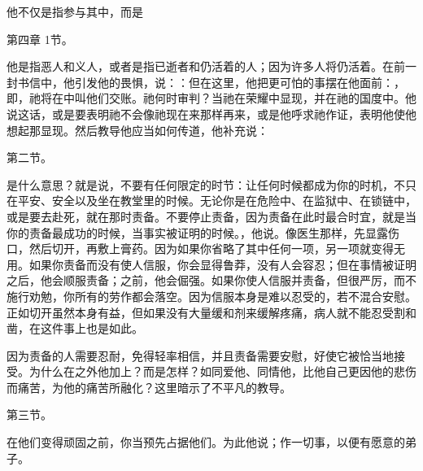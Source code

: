 他不仅是指参与其中，而是\par

第四章 1节。\par

他是指恶人和义人，或者是指已逝者和仍活着的人；因为许多人将仍活着。在前一封书信中，他引发他的畏惧，说：：但在这里，他把更可怕的事摆在他面前：，即，祂将在中叫他们交账。祂何时审判？当祂在荣耀中显现，并在祂的国度中。他说这话，或是要表明祂不会像祂现在来那样再来，或是他呼求祂作证，表明他使他想起那显现。然后教导他应当如何传道，他补充说：\par

第二节。\par

是什么意思？就是说，不要有任何限定的时节：让任何时候都成为你的时机，不只在平安、安全以及坐在教堂里的时候。无论你是在危险中、在监狱中、在锁链中，或是要去赴死，就在那时责备。不要停止责备，因为责备在此时最合时宜，就是当你的责备最成功的时候，当事实被证明的时候。，他说。像医生那样，先显露伤口，然后切开，再敷上膏药。因为如果你省略了其中任何一项，另一项就变得无用。如果你责备而没有使人信服，你会显得鲁莽，没有人会容忍；但在事情被证明之后，他会顺服责备；之前，他会倔强。如果你使人信服并责备，但很严厉，而不施行劝勉，你所有的劳作都会落空。因为信服本身是难以忍受的，若不混合安慰。正如切开虽然本身有益，但如果没有大量缓和剂来缓解疼痛，病人就不能忍受割和凿，在这件事上也是如此。\par

因为责备的人需要忍耐，免得轻率相信，并且责备需要安慰，好使它被恰当地接受。为什么在之外他加上？而是怎样？如同爱他、同情他，比他自己更因他的悲伤而痛苦，为他的痛苦所融化？这里暗示了不平凡的教导。\par

第三节。\par

在他们变得顽固之前，你当预先占据他们。为此他说；作一切事，以便有愿意的弟子。\par

